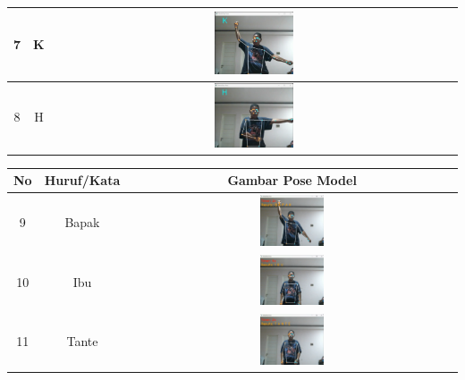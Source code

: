 \begin{table}[h]
\begin{tabular}{|c|c|c|}
	\hline
	7 & K & \includegraphics[width=0.2\textwidth]{gambar/bener/HurufK_ModelCNN_Fachry.png} \\
	\hline
	8 & H & \includegraphics[width=0.2\textwidth]{gambar/bener/HurufH_ModelCNN_Fachry.png} \\
	\hline
	\end{tabular}
	\end{table}

	\begin{table}[h]
		\centering
		\begin{tabular}{|c|c|c|}
			\hline
			No & Huruf/Kata & Gambar Pose Model  \\
			\hline
			9 & Bapak & \includegraphics[width=0.2\textwidth]{gambar/bener/HurufBapak_ModelCNN_Fachry.png} \\
			\hline
			10 & Ibu & \includegraphics[width=0.2\textwidth]{gambar/bener/HurufIbu_ModelCNN_Fachry.png} \\
			\hline
			11 & Tante & \includegraphics[width=0.2\textwidth]{gambar/bener/HurufTante_ModelCNN_Fachry.png} \\
			\hline
		\end{tabular}
	\end{table}


